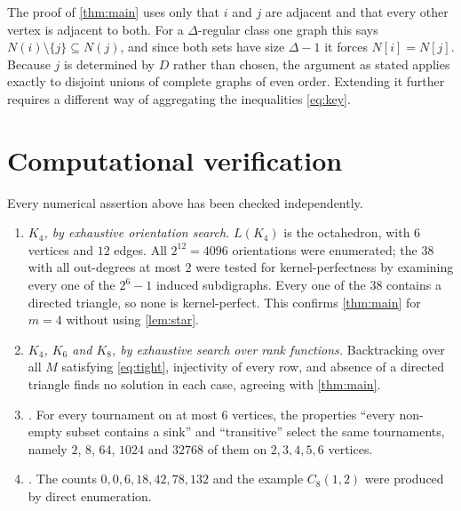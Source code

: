 \documentclass[11pt]{article}
\numberwithin{equation}{section}
\theoremstyle{plain}
\newcommand{\LG}{L}
\begin{document}
\begin{remark}\label{rem:reach}
The proof of \cref{thm:main} uses only that $i$ and $j$ are adjacent and that every other
vertex is adjacent to both. For a $\Delta$-regular class one graph this says
$N(i)\setminus\{j\}\subseteq N(j)$, and since both sets have size $\Delta-1$ it forces
$N[i]=N[j]$. Because $j$ is determined by $D$ rather than chosen, the argument as stated
applies exactly to disjoint unions of complete graphs of even order. Extending it further
requires a different way of aggregating the inequalities \eqref{eq:key}.
\end{remark}

\section{Computational verification}\label{sec:computation}

Every numerical assertion above has been checked independently.

\begin{enumerate}[label=\textup{(\arabic*)}]
  \item \emph{$K_4$, by exhaustive orientation search.} $\LG(K_4)$ is the octahedron, with
  $6$ vertices and $12$ edges. All $2^{12}=4096$ orientations were enumerated; the $38$ with
  all out-degrees at most $2$ were tested for kernel-perfectness by examining every one of the
  $2^{6}-1$ induced subdigraphs. Every one of the $38$ contains a directed triangle, so none
  is kernel-perfect. This confirms \cref{thm:main} for $m=4$ without using
  \cref{lem:star}.

  \item \emph{$K_4$, $K_6$ and $K_8$, by exhaustive search over rank functions.} Backtracking
  over all $M$ satisfying \eqref{eq:tight}, injectivity of every row, and absence of a
  directed triangle finds no solution in each case, agreeing with \cref{thm:main}.

  \item \emph{.} For every tournament on at most $6$ vertices, the properties
  ``every non-empty subset contains a sink'' and ``transitive'' select the same tournaments,
  namely $2$, $8$, $64$, $1024$ and $32768$ of them on $2,3,4,5,6$ vertices.

  \item \emph{.} The counts $0,0,6,18,42,78,132$ and the example
  $C_8(1,2)$ were produced by direct enumeration.
\end{enumerate}
\end{document}
